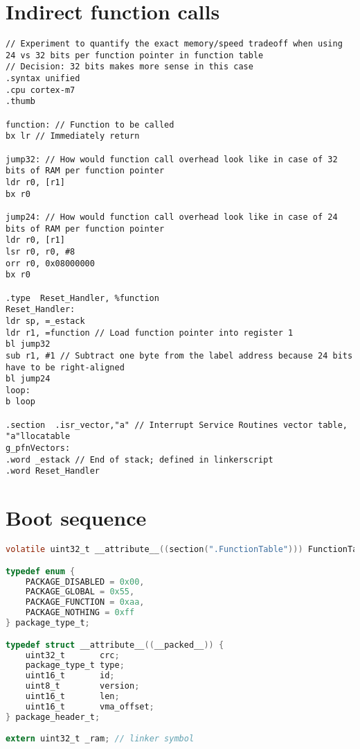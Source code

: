 \newpage

\begin{appendices}
\printglossaries

\newpage
\section{Indirect function calls}
\label{apx:calls}
\begin{lstlisting}[style=asm]
// Experiment to quantify the exact memory/speed tradeoff when using 24 vs 32 bits per function pointer in function table
// Decision: 32 bits makes more sense in this case
.syntax unified
.cpu cortex-m7
.thumb

function: // Function to be called
bx lr // Immediately return

jump32: // How would function call overhead look like in case of 32 bits of RAM per function pointer
ldr r0, [r1]
bx r0

jump24: // How would function call overhead look like in case of 24 bits of RAM per function pointer
ldr r0, [r1]
lsr r0, r0, #8
orr r0, 0x08000000
bx r0

.type  Reset_Handler, %function
Reset_Handler:
ldr sp, =_estack
ldr r1, =function // Load function pointer into register 1
bl jump32
sub r1, #1 // Subtract one byte from the label address because 24 bits have to be right-aligned
bl jump24
loop:
b loop

.section  .isr_vector,"a" // Interrupt Service Routines vector table, "a"llocatable
g_pfnVectors:
.word _estack // End of stack; defined in linkerscript
.word Reset_Handler
\end{lstlisting}


\newpage
\section{Boot sequence}
\label{apx:gentable}
\begin{lstlisting}[language=C]
volatile uint32_t __attribute__((section(".FunctionTable"))) FunctionTable[255]; // Table of function pointers

typedef enum {
	PACKAGE_DISABLED = 0x00,
	PACKAGE_GLOBAL = 0x55,
	PACKAGE_FUNCTION = 0xaa,
	PACKAGE_NOTHING = 0xff
} package_type_t;

typedef struct __attribute__((__packed__)) {
	uint32_t       crc;
	package_type_t type;
	uint16_t       id;
	uint8_t        version;
	uint16_t       len;
	uint16_t       vma_offset;
} package_header_t;

extern uint32_t _ram; // linker symbol


\end{lstlisting}
\end{appendices}
